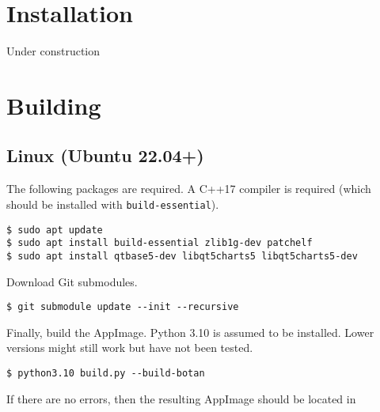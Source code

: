 \documentclass[a4paper, final, oneside, extrafontsizes]{memoir}
\newcommand{\appname}[0]{\textit{Theoretical Diary}}
\begin{document}
\begin{titlingpage}
\end{titlingpage}

\tableofcontents
\clearpage
\listoffigures
\clearpage
\listoftables
\clearpage
\lstlistoflistings
\clearpage
{}

\chapter{Installation}
Under construction

\chapter{Building}

\section{Linux (Ubuntu 22.04+)}
The following packages are required. A C++17 compiler is required (which should
be installed with \verb|build-essential|).
\begin{verbatim}
$ sudo apt update
$ sudo apt install build-essential zlib1g-dev patchelf
$ sudo apt install qtbase5-dev libqt5charts5 libqt5charts5-dev
\end{verbatim}

Download Git submodules.
\begin{verbatim}
$ git submodule update --init --recursive
\end{verbatim}

Finally, build the AppImage. Python 3.10 is assumed to be installed. Lower
versions might still work but have not been tested.

\begin{verbatim}
$ python3.10 build.py --build-botan
\end{verbatim}

If there are no errors, then the resulting AppImage should be located in
\end{document}
